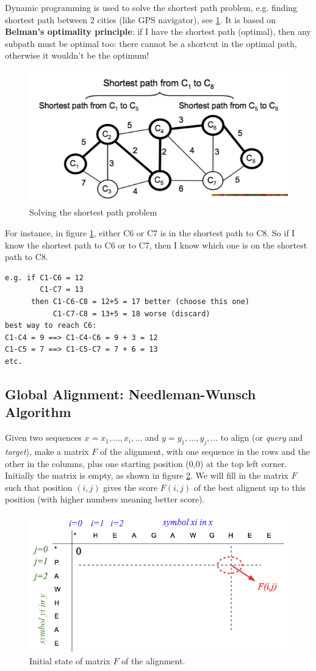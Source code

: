 Dynamic programming is used to solve the shortest path problem, e.g. finding shortest path between 2 cities (like GPS navigator), see \ref{fig:shortestpath}. It is based on {\bf Belman's optimality principle}: if I have the shortest path (optimal), then any subpath must be optimal too: there cannot be a shortcut in the optimal path, otherwise it wouldn't be the optimum!

\begin{figure}[!htb]
\centerline{\includegraphics[width=.6\linewidth]{figs/shortestpath.png}}
\caption{Solving the shortest path problem}\label{fig:shortestpath}
\end{figure}

For instance, in figure \ref{fig:shortestpath}, either C6 or C7 is in the shortest path to C8. So if I know the shortest path to C6 or to C7, then I know which one is on the shortest path to C8.

\begin{verbatim}
e.g. if C1-C6 = 12
        C1-C7 = 13
      then C1-C6-C8 = 12+5 = 17 better (choose this one)
           C1-C7-C8 = 13+5 = 18 worse (discard)
best way to reach C6:
C1-C4 = 9 ==> C1-C4-C6 = 9 + 3 = 12
C1-C5 = 7 ==> C1-C5-C7 = 7 + 6 = 13
etc.
\end{verbatim}

\subsection{Global Alignment: Needleman-Wunsch Algorithm}

Given two sequences $x=x_1,...,x_i,...$ and $y=y_1,...,y_j,...$ to align (or {\em query} and {\em target}), make a matrix $F$ of the alignment, with one sequence in the rows and the other in the columns, plus one starting position (0,0) at the top left corner. Initially the matrix is empty, as shown in figure \ref{fig:fijempty}. We will fill in the matrix $F$ such that position $(i,j)$ gives the score $F(i,j)$ of the best alignent up to this position (with higher numbers meaning better score).

\begin{figure}[!htb]
\centerline{\includegraphics[width=.6\linewidth]{figs/fijempty.png}}
\caption{Initial state of matrix $F$ of the alignment.}\label{fig:fijempty}
\end{figure}

